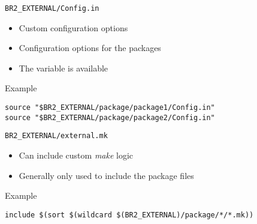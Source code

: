 \begin{frame}[fragile]{{\tt BR2\_EXTERNAL/Config.in}}

  \begin{itemize}
  \item Custom configuration options
  \item Configuration options for the  packages
  \item The  variable is available
  \end{itemize}

  \begin{block}{Example }
\begin{verbatim}
source "$BR2_EXTERNAL/package/package1/Config.in"
source "$BR2_EXTERNAL/package/package2/Config.in"
\end{verbatim}
  \end{block}

\end{frame}

\begin{frame}[fragile]{{\tt BR2\_EXTERNAL/external.mk}}

  \begin{itemize}
  \item Can include custom {\em make} logic
  \item Generally only used to include the package  files
  \end{itemize}

  \begin{block}{Example }
\begin{verbatim}
include $(sort $(wildcard $(BR2_EXTERNAL)/package/*/*.mk))
\end{verbatim}
  \end{block}
\end{frame}

